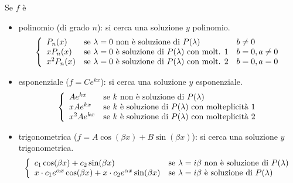 Se $f$ è
\begin{itemize}
    \item polinomio (di grado $n$): si cerca una soluzione $y$ polinomio.
    \begin{equation}
        \left\{
            \begin{array}{l l l}
                P_n(x) & \mbox{se } \lambda = 0 \mbox{ non è soluzione di } P(\lambda) & b \neq 0\\
                xP_n(x) & \mbox{se } \lambda = 0 \mbox{ è soluzione di } P(\lambda) \mbox{ con molt. 1} & b = 0, a \neq 0 \\
                x^2 P_n(x) & \mbox{se } \lambda = 0 \mbox{ è soluzione di } P(\lambda) \mbox{ con molt. 2} & b = 0, a = 0 \\
            \end{array}
        \right.
    \end{equation}
    
    \item esponenziale ($f = C e^{kx}$): si cerca una soluzione $y$ esponenziale.
    \begin{equation}
        \left\{
            \begin{array}{l l}
                Ae^{kx} & \mbox{se } k \mbox{ non è soluzione di $P(\lambda)$} \\
                xAe^{kx} & \mbox{se } k \mbox{ è soluzione di $P(\lambda)$ con molteplicità } 1\\
                x^2Ae^{kx} & \mbox{se } k \mbox{ è soluzione di $P(\lambda)$ con molteplicità } 2\\
            \end{array}
        \right.
    \end{equation}
    
    \item trigonometrica ($f = A \cos(\beta x) + B \sin(\beta x)$): si cerca una soluzione $y$ trigonometrica.
    \begin{equation}
        \left\{
            \begin{array}{l l}
                c_1 \cos(\beta x) + c_2 \sin (\beta x) & \mbox{se } \lambda = i\beta \mbox{ non è soluzione di } P(\lambda) \\
                x\cdot c_1 e^{\alpha x} \cos(\beta x) + x\cdot c_2 e^{\alpha x} \sin (\beta x) & \mbox{se } \lambda = i\beta \mbox{ è soluzione di } P(\lambda)\\
            \end{array}
        \right.
    \end{equation}
    

\end{itemize}
